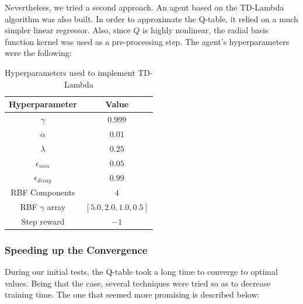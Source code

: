 \documentclass[11pt,twoside]{article}
\begin{document}
Nevertheless, we tried a second approach. An agent based on the TD-Lambda algorithm was also built. In order to approximate the Q-table, it relied on a much simpler linear regressor. Also, since $Q$ is highly nonlinear, the radial basis function kernel was used as a pre-processing step. The agent's hyperparameters were the following:

\begin{table}[H]
	\begin{center}
		\begin{tabular}{|c |c|} 
			\hline
			Hyperparameter & Value \\
			\hline\hline
			$\gamma$ & $0.999$ \\
			$\alpha$ & $0.01$ \\
			$\lambda$ & $0.25$ \\
			$\epsilon_{min}$ & $0.05$ \\
			$\epsilon_{decay}$ & $0.99$ \\
			RBF Components & $4$ \\
			RBF $\gamma$ array & $[5.0, 2.0, 1.0, 0.5]$ \\
			Step reward & $-1$ \\
			\hline
		\end{tabular}
		\caption{Hyperparameters used to implement TD-Lambda}
	\end{center}
\end{table}

\subsubsection{Speeding up the Convergence}\label{speed_conv}

During our initial tests, the Q-table took a long time to converge to optimal values. Being that the case, several techniques were tried so as to decrease training time. The one that seemed more promising is described below:
\end{document}
